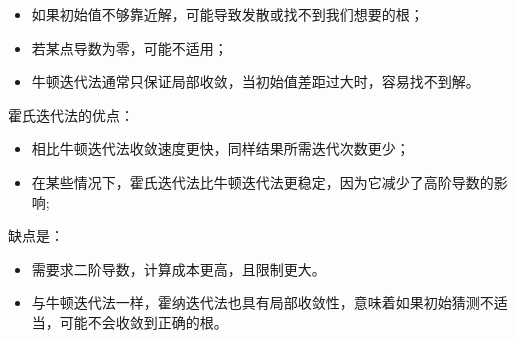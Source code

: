 \documentclass[10pt,a4paper,oneside]{article}
\begin{document}
\begin{itemize}
  \item 如果初始值不够靠近解，可能导致发散或找不到我们想要的根；
  \item 若某点导数为零，可能不适用；
  \item 牛顿迭代法通常只保证局部收敛，当初始值差距过大时，容易找不到解。
\end{itemize}

霍氏迭代法的优点：

\begin{itemize}
  \item 相比牛顿迭代法收敛速度更快，同样结果所需迭代次数更少；
  \item 在某些情况下，霍氏迭代法比牛顿迭代法更稳定，因为它减少了高阶导数的影响;
\end{itemize}

缺点是：

\begin{itemize}
  \item 需要求二阶导数，计算成本更高，且限制更大。
  \item 与牛顿迭代法一样，霍纳迭代法也具有局部收敛性，意味着如果初始猜测不适当，可能不会收敛到正确的根。
\end{itemize}
\end{document}
